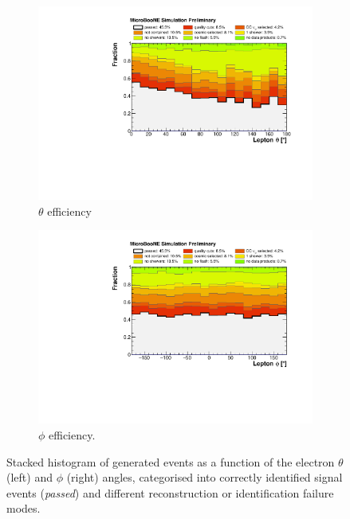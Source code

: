 \begin{figure}
\centering
  \begin{subfigure}{0.48\textwidth}
    \includegraphics[width=\linewidth]{figures/ineff_theta.pdf}
    \caption{$\theta$ efficiency} 
  \end{subfigure}
    \begin{subfigure}{0.48\textwidth}
    \includegraphics[width=\linewidth]{figures/ineff_phi.pdf}
    \caption{$\phi$ efficiency.} 
  \end{subfigure}
  \caption{Stacked histogram of generated events as a function of the electron $\theta$ (left) and $\phi$ (right) angles, categorised into correctly identified signal events {(\emph{passed})} and different reconstruction or identification failure modes.}
  \label{fig:ineff_angles}
\end{figure}

